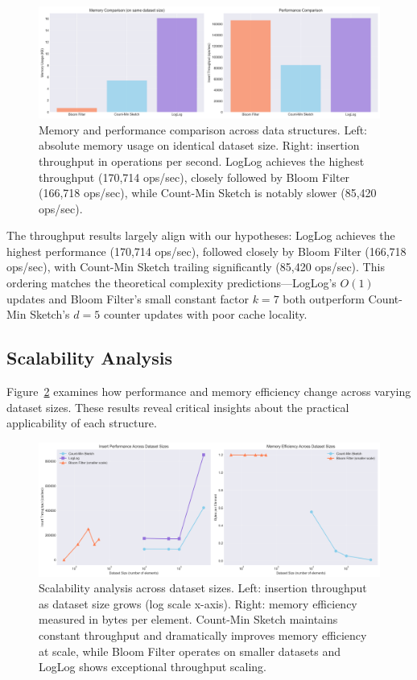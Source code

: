 \begin{figure}[h]
\centering
\includegraphics[width=\textwidth]{../figures/benchmarks/memory_performance_comparison.png}
\caption{Memory and performance comparison across data structures. Left: absolute memory usage on identical dataset size. Right: insertion throughput in operations per second. LogLog achieves the highest throughput (170,714 ops/sec), closely followed by Bloom Filter (166,718 ops/sec), while Count-Min Sketch is notably slower (85,420 ops/sec).}
\label{fig:memory_performance}
\end{figure}

The throughput results largely align with our hypotheses: LogLog achieves the highest performance (170,714 ops/sec), followed closely by Bloom Filter (166,718 ops/sec), with Count-Min Sketch trailing significantly (85,420 ops/sec). This ordering matches the theoretical complexity predictions---LogLog's $O(1)$ updates and Bloom Filter's small constant factor $k=7$ both outperform Count-Min Sketch's $d=5$ counter updates with poor cache locality.

\subsection{Scalability Analysis}

Figure~\ref{fig:scalability} examines how performance and memory efficiency change across varying dataset sizes. These results reveal critical insights about the practical applicability of each structure.

\begin{figure}[h]
\centering
\includegraphics[width=\textwidth]{../figures/benchmarks/scalability_analysis.png}
\caption{Scalability analysis across dataset sizes. Left: insertion throughput as dataset size grows (log scale x-axis). Right: memory efficiency measured in bytes per element. Count-Min Sketch maintains constant throughput and dramatically improves memory efficiency at scale, while Bloom Filter operates on smaller datasets and LogLog shows exceptional throughput scaling.}
\label{fig:scalability}
\end{figure}

